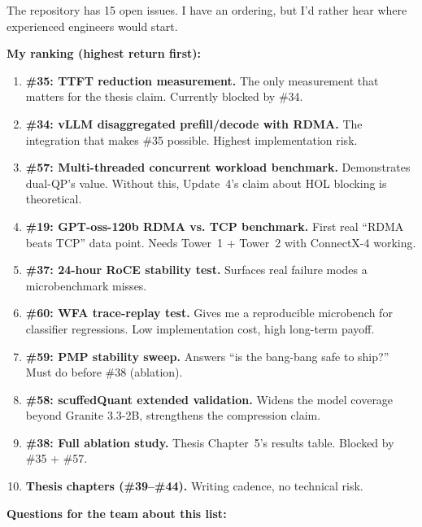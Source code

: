 \documentclass[11pt]{article}
\begin{document}
The repository has 15 open issues. I have an ordering, but I'd rather
hear where experienced engineers would start.

\textbf{My ranking (highest return first):}

\begin{enumerate}
\item \textbf{\#35: TTFT reduction measurement.} The only measurement
that matters for the thesis claim. Currently blocked by \#34.

\item \textbf{\#34: vLLM disaggregated prefill/decode with RDMA.}
The integration that makes \#35 possible. Highest implementation risk.

\item \textbf{\#57: Multi-threaded concurrent workload benchmark.}
Demonstrates dual-QP's value. Without this, Update~4's claim about
HOL blocking is theoretical.

\item \textbf{\#19: GPT-oss-120b RDMA vs. TCP benchmark.} First
real ``RDMA beats TCP'' data point. Needs Tower~1 + Tower~2 with
ConnectX-4 working.

\item \textbf{\#37: 24-hour RoCE stability test.} Surfaces real
failure modes a microbenchmark misses.

\item \textbf{\#60: WFA trace-replay test.} Gives me a reproducible
microbench for classifier regressions. Low implementation cost, high
long-term payoff.

\item \textbf{\#59: PMP stability sweep.} Answers ``is the bang-bang
safe to ship?'' Must do before \#38 (ablation).

\item \textbf{\#58: scuffedQuant extended validation.} Widens the
model coverage beyond Granite 3.3-2B, strengthens the compression
claim.

\item \textbf{\#38: Full ablation study.} Thesis Chapter~5's results
table. Blocked by \#35 + \#57.

\item \textbf{Thesis chapters (\#39--\#44).} Writing cadence, no
technical risk.
\end{enumerate}

\textbf{Questions for the team about this list:}
\end{document}
